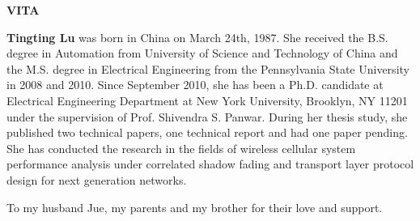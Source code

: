 \newpage
\begin{center}
 {\large\bf VITA}\vspace{0.3in} \\
 
 
\end{center}

\doublespacing

\vspace{-1mm}
\textbf{Tingting Lu} was born in China on March 24th, 1987. She received the B.S. degree in Automation from University of Science and Technology of China and the M.S. degree in Electrical Engineering from the Pennsylvania State University in 2008 and 2010. Since September 2010, she has been a Ph.D. candidate at Electrical Engineering Department at New York University, Brooklyn, NY 11201 under the supervision of Prof. Shivendra S. Panwar. During her thesis study, she published two technical papers, one technical report and had one paper pending. She has conducted the research in the fields of wireless cellular system performance analysis under correlated shadow fading and transport layer protocol design for next generation networks.

\newpage
 
 
 \vspace*{2in}

 
{\large \sl
\hspace{1in} 

To my husband Jue, my parents and my brother for their love and support.   

}


